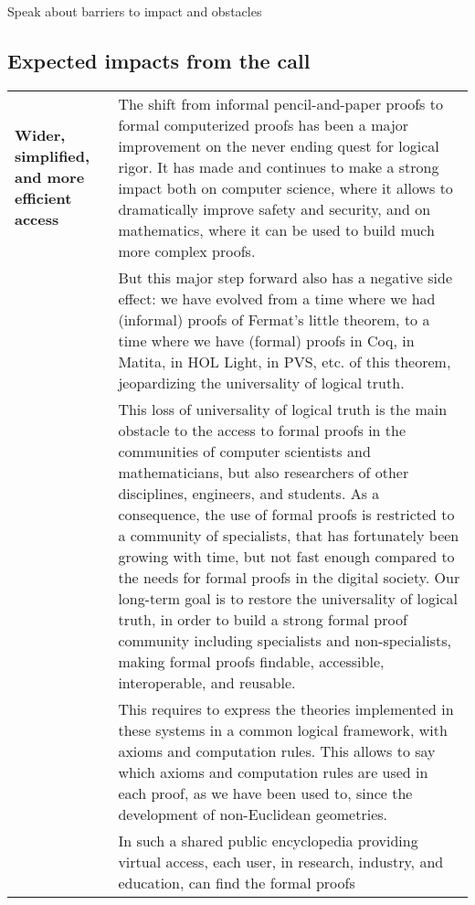 {\color{red} Speak about barriers to impact and obstacles}

\subsection*{Expected impacts from the call}

\begin{longtable}{|p{}|p{}|}
\hline
{\bf Wider, simplified, and more efficient access}&
The shift from informal pencil-and-paper proofs to formal computerized
proofs has been a major improvement on the never ending quest for
logical rigor. It has made and continues to make a strong impact both
on computer science, where it allows to dramatically improve safety
and security, and on mathematics, where it can be used to build much
more complex proofs.\\
&
\hspace{0.4cm}
But this major step forward also has a negative side effect: we have
evolved from a time where we had (informal) proofs of Fermat's little
theorem, to a time where we have (formal) proofs in Coq, in Matita, in
HOL Light, in PVS, etc.  of this theorem, jeopardizing the
universality of logical truth.\\
&
\hspace*{0.4cm} This loss of universality of logical truth is the main
obstacle to the access to formal proofs in the communities of computer
scientists and mathematicians, but also researchers of other
disciplines, engineers, and students. As a consequence, the use of
formal proofs is restricted to a community of specialists, that has
fortunately been growing with time, but not fast enough
compared to the needs for formal proofs in the digital society.  Our
long-term goal is to restore the universality of logical truth, in
order to build a strong formal proof community including specialists
and non-specialists, making formal proofs findable, accessible,
interoperable, and reusable.\\ 
&
\hspace{0.4cm}
This requires to express the theories implemented in these systems in
a common logical framework, with axioms and computation rules. This allows
to say which axioms and computation rules are used in
each proof, as we have been used to, since the development of
non-Euclidean geometries.\\
&
\hspace{0.4cm}
In such a shared public encyclopedia providing virtual access, each
user, in research, industry, and education, can find the formal proofs

\end{longtable}
